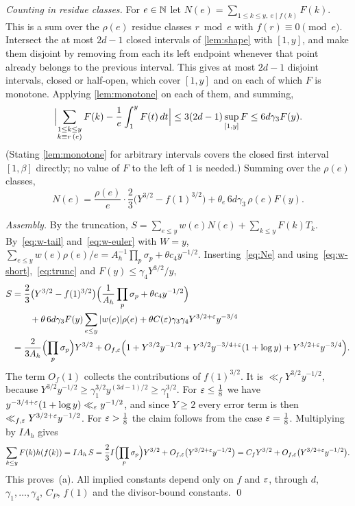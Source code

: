 \emph{Counting in residue classes.} For $e\in\mathbb{N}$ let $N(e)=\sum_{1\le k\le y,\ e\mid f(k)}F(k)$. This is a sum over the $\rho(e)$ residue classes $r\bmod e$ with $f(r)\equiv0\pmod e$. Intersect the at most $2d-1$ closed intervals of \cref{lem:shape} with $[1,y]$, and make them disjoint by removing from each its left endpoint whenever that point already belongs to the previous interval. This gives at most $2d-1$ disjoint intervals, closed or half-open, which cover $[1,y]$ and on each of which $F$ is monotone. Applying \cref{lem:monotone} on each of them, and summing,
\[
\Bigl|\sum_{\substack{1\le k\le y\\k\equiv r\,(e)}}F(k)-\frac1e\int_1^yF(t)\,dt\Bigr|\le3(2d-1)\sup_{[1,y]}F\le6d\gamma_3F(y).
\]
(Stating \cref{lem:monotone} for arbitrary intervals covers the closed first interval $[1,\beta]$ directly; no value of $F$ to the left of $1$ is needed.) Summing over the $\rho(e)$ classes,
\begin{equation}\label{eq:Ne}
N(e)=\frac{\rho(e)}e\cdot\frac23\bigl(Y^{3/2}-f(1)^{3/2}\bigr)+\theta_e\,6d\gamma_3\,\rho(e)F(y).
\end{equation}

\emph{Assembly.} By the truncation, $S=\sum_{e\le y}w(e)N(e)+\sum_{k\le y}F(k)T_k$. By~\eqref{eq:w-tail} and~\eqref{eq:w-euler} with $W=y$, $\sum_{e\le y}w(e)\rho(e)/e=A_h^{-1}\prod_p\sigma_p+\theta c_4y^{-1/2}$. Inserting~\eqref{eq:Ne} and using~\eqref{eq:w-short},~\eqref{eq:trunc} and $F(y)\le\gamma_4Y^{3/2}/y$,
\begin{align*}
S&=\frac23\bigl(Y^{3/2}-f(1)^{3/2}\bigr)\Bigl(\frac1{A_h}\prod_p\sigma_p+\theta c_4y^{-1/2}\Bigr)\\
&\qquad+\theta\,6d\gamma_3F(y)\sum_{e\le y}|w(e)|\rho(e)+\theta C(\varepsilon)\gamma_3\gamma_4Y^{3/2+\varepsilon}y^{-3/4}\\
&=\frac2{3A_h}\Bigl(\prod_p\sigma_p\Bigr)Y^{3/2}+O_{f,\varepsilon}\Bigl(1+Y^{3/2}y^{-1/2}+Y^{3/2}y^{-3/4+\varepsilon}(1+\log y)+Y^{3/2+\varepsilon}y^{-3/4}\Bigr).
\end{align*}
The term $O_f(1)$ collects the contributions of $f(1)^{3/2}$. It is $\ll_fY^{3/2}y^{-1/2}$, because $Y^{3/2}y^{-1/2}\ge\gamma_1^{3/2}y^{(3d-1)/2}\ge\gamma_1^{3/2}$. For $\varepsilon\le\frac18$ we have $y^{-3/4+\varepsilon}(1+\log y)\ll_\varepsilon y^{-1/2}$, and since $Y\ge2$ every error term is then $\ll_{f,\varepsilon}Y^{3/2+\varepsilon}y^{-1/2}$. For $\varepsilon>\frac18$ the claim follows from the case $\varepsilon=\frac18$. Multiplying by $IA_h$ gives
\[
\sum_{k\le y}F(k)h(f(k))=IA_h\,S=\frac23I\Bigl(\prod_p\sigma_p\Bigr)Y^{3/2}+O_{f,\varepsilon}\bigl(Y^{3/2+\varepsilon}y^{-1/2}\bigr)=C_fY^{3/2}+O_{f,\varepsilon}\bigl(Y^{3/2+\varepsilon}y^{-1/2}\bigr).
\]
This proves~(a). All implied constants depend only on $f$ and $\varepsilon$, through $d$, $\gamma_1,\dots,\gamma_4$, $C_P$, $f(1)$ and the divisor-bound constants. \qed
